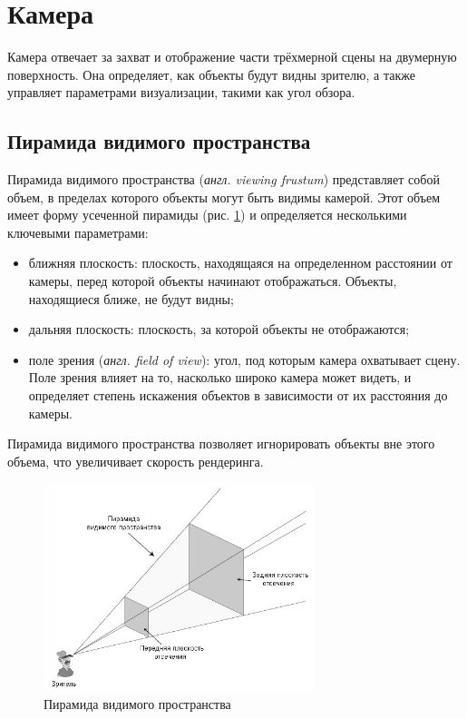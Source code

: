\section{Камера}

Камера отвечает за захват и отображение части трёхмерной сцены на двумерную поверхность. Она определяет, как объекты будут видны зрителю, а также управляет параметрами визуализации, такими как угол обзора.

\subsection{Пирамида видимого пространства}

Пирамида видимого пространства (\textit{англ. viewing frustum}) представляет собой объем, в пределах которого объекты могут быть видимы камерой. Этот объем имеет форму усеченной пирамиды (рис. \ref{fig:viewing-frustum}) и определяется несколькими ключевыми параметрами:
\begin{itemize}[label=--]
	\item ближняя плоскость: плоскость, находящаяся на определенном расстоянии от камеры, перед которой объекты начинают отображаться. Объекты, находящиеся ближе, не будут видны;
	\item дальняя плоскость: плоскость, за которой объекты не отображаются;
	\item поле зрения (\textit{англ. field of view}): угол, под которым камера охватывает сцену. Поле зрения влияет на то, насколько широко камера может видеть, и определяет степень искажения объектов в зависимости от их расстояния до камеры.
\end{itemize}

Пирамида видимого пространства позволяет игнорировать объекты вне этого объема, что увеличивает скорость рендеринга.

\clearpage

\begin{figure}[h] 
	\centering
	\includegraphics[width=0.7\textwidth]{images/viewing-frustum.png}
	\caption{Пирамида видимого пространства} 
	\label{fig:viewing-frustum} 
\end{figure}

